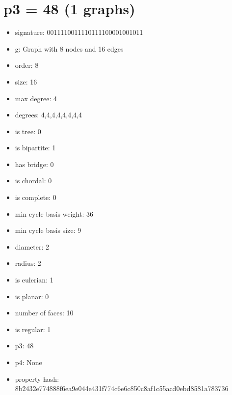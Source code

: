 \chapter{p3 = 48 (1 graphs)}
\newpage\begin{figure}
\end{figure}
\begin{itemize}
\item signature: 0011110011110111100001001011
\item g: Graph with 8 nodes and 16 edges
\item order: 8
\item size: 16
\item max degree: 4
\item degrees: 4,4,4,4,4,4,4,4
\item is tree: 0
\item is bipartite: 1
\item has bridge: 0
\item is chordal: 0
\item is complete: 0
\item min cycle basis weight: 36
\item min cycle basis size: 9
\item diameter: 2
\item radius: 2
\item is eulerian: 1
\item is planar: 0
\item number of faces: 10
\item is regular: 1
\item p3: 48
\item p4: None
\item property hash: 8b2432e774888f6ea9e044e431f774c6e6c850c8af1c55acd0ebd8581a783736
\end{itemize}
\newpage
